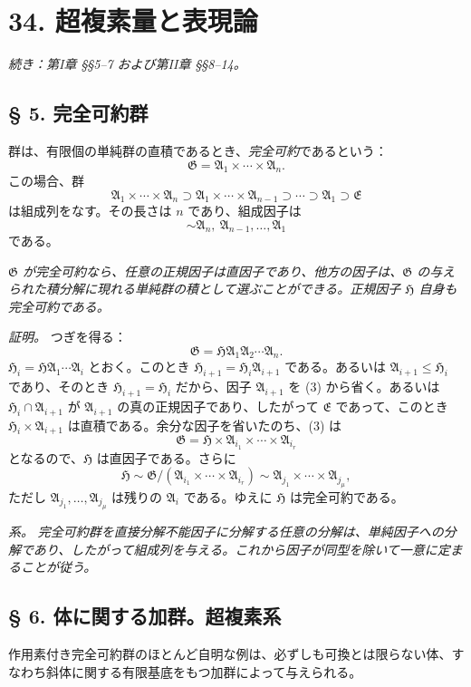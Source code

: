 \documentclass[11pt]{article}
\providecommand{\mG}{\mathfrak{G}}
\providecommand{\mA}{\mathfrak{A}}
\providecommand{\mE}{\mathfrak{E}}
\providecommand{\mH}{\mathfrak{H}}
\begin{document}
\setcounter{footnote}{0}
\section*{34. 超複素量と表現論}
\emph{続き：第I章 §§5--7 および第II章 §§8--14。}

\subsection*{§ 5. 完全可約群}

群は、有限個の単純群の直積であるとき、\emph{完全可約}であるという：
\[
        \mG=\mA_1\times\cdots\times\mA_n.
\]
この場合、群
\[
        \mA_1\times\cdots\times\mA_n
        \supset \mA_1\times\cdots\times\mA_{n-1}
        \supset\cdots\supset \mA_1\supset \mE
\]
は組成列をなす。その長さは $n$ であり、組成因子は
\[
        \sim \mA_n,\ \mA_{n-1},\ldots,\mA_1
\]
である。

\emph{$\mG$ が完全可約なら、任意の正規因子は直因子であり、他方の因子は、$\mG$ の与えられた積分解に現れる単純群の積として選ぶことができる。正規因子 $\mH$ 自身も完全可約である。}

\emph{証明。} つぎを得る：
\begin{equation}
        \mG=\mH\mA_1\mA_2\cdots\mA_n.             \tag{3}
\end{equation}
$\mH_i=\mH\mA_1\cdots\mA_i$ とおく。このとき $\mH_{i+1}=\mH_i\mA_{i+1}$ である。あるいは $\mA_{i+1}\leq \mH_i$ であり、そのとき $\mH_{i+1}=\mH_i$ だから、因子 $\mA_{i+1}$ を (3) から省く。あるいは $\mH_i\cap\mA_{i+1}$ が $\mA_{i+1}$ の真の正規因子であり、したがって $\mE$ であって、このとき $\mH_i\times\mA_{i+1}$ は直積である。余分な因子を省いたのち、(3) は
\[
        \mG=\mH\times\mA_{i_1}\times\cdots\times\mA_{i_r}
\]
となるので、$\mH$ は直因子である。さらに
\[
        \mH\sim \mG/(\mA_{i_1}\times\cdots\times\mA_{i_r})
        \sim \mA_{j_1}\times\cdots\times\mA_{j_\mu},
\]
ただし $\mA_{j_1},\ldots,\mA_{j_\mu}$ は残りの $\mA_i$ である。ゆえに $\mH$ は完全可約である。

\emph{系。} \emph{完全可約群を直接分解不能因子に分解する任意の分解は、単純因子への分解であり、したがって組成列を与える。これから因子が同型を除いて一意に定まることが従う。}

\subsection*{§ 6. 体に関する加群。超複素系}

作用素付き完全可約群のほとんど自明な例は、必ずしも可換とは限らない体、すなわち斜体に関する有限基底をもつ加群によって与えられる。
\end{document}
